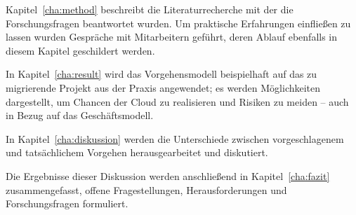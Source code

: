 Kapitel~\ref{cha:method} beschreibt die Literaturrecherche mit der die 
Forschungsfragen beantwortet wurden. Um praktische Erfahrungen einfließen zu 
lassen wurden Gespräche mit Mitarbeitern geführt, deren Ablauf ebenfalls in 
diesem Kapitel geschildert werden.

In Kapitel~\ref{cha:result} wird das Vorgehensmodell beispielhaft auf das zu 
migrierende Projekt aus der Praxis angewendet; es werden Möglichkeiten 
dargestellt, um Chancen der Cloud zu realisieren und Risiken zu meiden -- auch 
in Bezug auf das Geschäftsmodell.

In Kapitel~\ref{cha:diskussion} werden die Unterschiede zwischen 
vorgeschlagenem und tatsächlichem Vorgehen herausgearbeitet und diskutiert.

Die Ergebnisse dieser Diskussion werden anschließend in Kapitel~\ref{cha:fazit} 
zusammengefasst, offene Fragestellungen, Herausforderungen und Forschungsfragen 
formuliert.
\begin{comment}


Lösungen 
haben ganz allgemein zwei Vorteile für Unternehmen, die am für Salesforce 
typischen Beispiel einer Kundenverwaltung schildern möchte. Möchte ein 
Unternehmen Informationen zu seinen Kunden zentral speichern, muss es bei einer 
Cloudlösung keinen Server installieren und warten. Es kann also Kosten für 
Hardware sowie mindestens noch Personalkosten bei der Administration einsparen. 
Der erste Vorteil entsteht also durch Kosteneinsparungen auf Serverseite des 
Unternehmens. Cloudbasierte Software lässt sich regelmäßig mit einem Browser 
bedienen, der auf allen mobilen und internetfähigen Geräten wie auf 
herkömmlichen Computern verfügbar sein dürfte. Im Beispiel muss der Anwender, 
der Zugriff auf die Kundendaten nehmen will, keine Software installieren und 
ist an kein Gerät gebunden.\\
Die Idee hinter dem Migrationsprojekt ist die Verbindung der Expertise beider 
Unternehmen: Die Nutzung des aufgebauten Know-Hows auf einer neuen, 
zukunftsfähigen Plattform. \\
Dabei stellen sich die folgenden Fragen:
\begin{itemize}
	\item Welche Strategie sollte künftig mit dem bestehenden Produkt 
verfolgt werden?
	\item In welchem Umfang soll die Cloud Software durch 
	\begin{itemize}
		\item den Anbieter
		\item den Kunden
	\end{itemize}
	anpassbar sein?
	\item Wie lassen sich idealerweise die Anforderungen ermitteln?
	\item Welche Funktionen sollen übernommen werden?
	\item Wie lässt sich ein bestehendes Produkt an die neuen Möglichkeiten 
der Cloud anpassen?
\end{itemize}

Im folgenden gebe ich einen Überblick über Methoden des 
Requirements-Engineering.
\end{comment}
